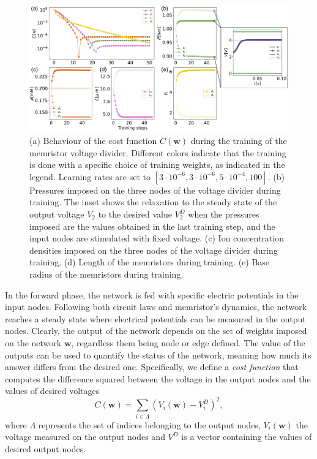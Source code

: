 \documentclass[reprint,superscriptaddress,prb,showkeys]{revtex4-2}
\newcommand{\brac}[1]{\left(#1 \right)} %
\begin{document}
\begin{figure}[t]
    \centering
    \includegraphics[width=1.7\columnwidth]{plots/voltage_divider/mse_weights_vd.pdf}
    \caption{(a) Behaviour of the cost function $C(\boldsymbol{w})$ during the training of the memristor voltage divider. Different colors indicate that the training is done with a specific choice of training weights, as indicated in the legend. Learning rates are set to $[3\cdot 10^{-6}, 3\cdot 10^{-6}, 5\cdot 10^{-4}, 100]$. (b) Pressures imposed on the three nodes of the voltage divider during training. The inset shows the relaxation to the steady state of the output voltage $V_2$ to the desired value $V_2^D$ when the pressures imposed are the values obtained in the last training step, and the input nodes are stimulated with fixed voltage. (c) Ion concentration densities imposed on the three nodes of the voltage divider during training. (d) Length of the memristors during training. (e) Base radius of the memristors during training.}\label{fig:mse_weights_vd}
\end{figure} 
In the forward phase, the network is fed with specific electric potentials in the input nodes. Following both circuit laws and memristor's dynamics, the network reaches a steady state where electrical potentials can be measured in the output nodes. Clearly, the output of the network depends on the set of weights imposed on the network $\boldsymbol{w}$, regardless them being node or edge defined. The value of the outputs can be used to quantify the status of the network, meaning how much its answer differs from the desired one. Specifically, we define a \emph{cost function} that computes the difference squared between the voltage in the output nodes and the values of desired voltages
\[
C\left( \boldsymbol{w} \right) = \sum_{i \in \Lambda} \brac{V_i\brac{\boldsymbol{w}} - V_i^D}^2,
\label{eq:cost_func}
\]
where $\Lambda$ represents the set of indices belonging to the output nodes, $V_i\brac{\boldsymbol{w}}$ the voltage measured on the output nodes and $V^D$ is a vector containing the values of desired output nodes.
\end{document}
